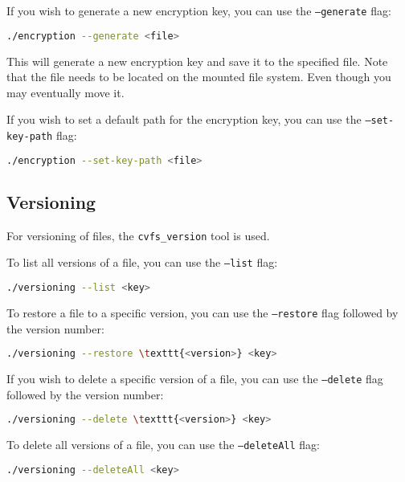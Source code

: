 If you wish to generate a new encryption key, you can use the \texttt{--generate} flag:

\begin{lstlisting}[language=bash, basicstyle=\ttfamily\small]
./encryption --generate <file>
\end{lstlisting}

This will generate a new encryption key and save it to the specified file.
Note that the file needs to be located on the mounted file system.
Even though you may eventually move it.

If you wish to set a default path for the encryption key, you can use the \texttt{--set-key-path} flag:

\begin{lstlisting}[language=bash, basicstyle=\ttfamily\small]
./encryption --set-key-path <file>
\end{lstlisting}

\subsection*{Versioning}

For versioning of files, the \texttt{cvfs\_version} tool is used.

To list all versions of a file, you can use the \texttt{--list} flag:

\begin{lstlisting}[language=bash, basicstyle=\ttfamily\small]
./versioning --list <key>
\end{lstlisting}

To restore a file to a specific version, you can use the \texttt{--restore} flag followed by the version number:

\begin{lstlisting}[language=bash, basicstyle=\ttfamily\small]
./versioning --restore \texttt{<version>} <key>
\end{lstlisting}

If you wish to delete a specific version of a file, you can use the \texttt{--delete} flag followed by the version number:

\begin{lstlisting}[language=bash, basicstyle=\ttfamily\small]
./versioning --delete \texttt{<version>} <key>
\end{lstlisting}

To delete all versions of a file, you can use the \texttt{--deleteAll} flag:

\begin{lstlisting}[language=bash, basicstyle=\ttfamily\small]
./versioning --deleteAll <key>
\end{lstlisting}
